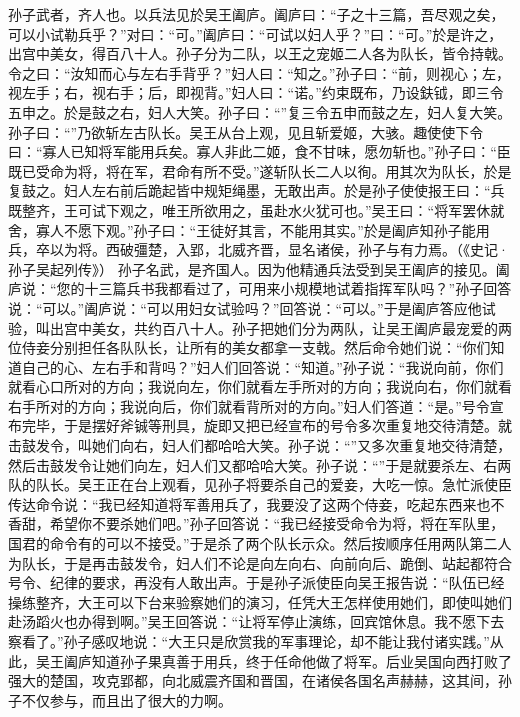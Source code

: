 \documentclass[11pt,a4paper,twoside]{book}
\begin{document}
\begin{paracol}{2}
孙子武者，齐人也。以兵法见於吴王阖庐。阖庐曰：“子之十三篇，吾尽观之矣，可以小试勒兵乎？”对曰：“可。”阖庐曰：“可试以妇人乎？”曰：“可。”於是许之，出宫中美女，得百八十人。孙子分为二队，以王之宠姬二人各为队长，皆令持戟。令之曰：“汝知而心与左右手背乎？”妇人曰：“知之。”孙子曰：“前，则视心；左，视左手；右，视右手；后，即视背。”妇人曰：“诺。”约束既布，乃设鈇钺，即三令五申之。於是鼓之右，妇人大笑。孙子曰：“”复三令五申而鼓之左，妇人复大笑。孙子曰：“”乃欲斩左古队长。吴王从台上观，见且斩爱姬，大骇。趣使使下令曰：“寡人已知将军能用兵矣。寡人非此二姬，食不甘味，愿勿斩也。”孙子曰：“臣既已受命为将，将在军，君命有所不受。”遂斩队长二人以徇。用其次为队长，於是复鼓之。妇人左右前后跪起皆中规矩绳墨，无敢出声。於是孙子使使报王曰：“兵既整齐，王可试下观之，唯王所欲用之，虽赴水火犹可也。”吴王曰：“将军罢休就舍，寡人不愿下观。”孙子曰：“王徒好其言，不能用其实。”於是阖庐知孙子能用兵，卒以为将。西破彊楚，入郢，北威齐晋，显名诸侯，孙子与有力焉。（《史记·孙子吴起列传》）
\switchcolumn
孙子名武，是齐国人。因为他精通兵法受到吴王阖庐的接见。阖庐说：“您的十三篇兵书我都看过了，可用来小规模地试着指挥军队吗？”孙子回答说：“可以。”阖庐说：“可以用妇女试验吗？”回答说：“可以。”于是阖庐答应他试验，叫出宫中美女，共约百八十人。孙子把她们分为两队，让吴王阖庐最宠爱的两位侍妾分别担任各队队长，让所有的美女都拿一支戟。然后命令她们说：“你们知道自己的心、左右手和背吗？”妇人们回答说：“知道。”孙子说：“我说向前，你们就看心口所对的方向；我说向左，你们就看左手所对的方向；我说向右，你们就看右手所对的方向；我说向后，你们就看背所对的方向。”妇人们答道：“是。”号令宣布完毕，于是摆好斧铖等刑具，旋即又把已经宣布的号令多次重复地交待清楚。就击鼓发令，叫她们向右，妇人们都哈哈大笑。孙子说：“”又多次重复地交待清楚，然后击鼓发令让她们向左，妇人们又都哈哈大笑。孙子说：“”于是就要杀左、右两队的队长。吴王正在台上观看，见孙子将要杀自己的爱妾，大吃一惊。急忙派使臣传达命令说：“我已经知道将军善用兵了，我要没了这两个侍妾，吃起东西来也不香甜，希望你不要杀她们吧。”孙子回答说：“我已经接受命令为将，将在军队里，国君的命令有的可以不接受。”于是杀了两个队长示众。然后按顺序任用两队第二人为队长，于是再击鼓发令，妇人们不论是向左向右、向前向后、跪倒、站起都符合号令、纪律的要求，再没有人敢出声。于是孙子派使臣向吴王报告说：“队伍已经操练整齐，大王可以下台来验察她们的演习，任凭大王怎样使用她们，即使叫她们赴汤蹈火也办得到啊。”吴王回答说：“让将军停止演练，回宾馆休息。我不愿下去察看了。”孙子感叹地说：“大王只是欣赏我的军事理论，却不能让我付诸实践。”从此，吴王阖庐知道孙子果真善于用兵，终于任命他做了将军。后业吴国向西打败了强大的楚国，攻克郢都，向北威震齐国和晋国，在诸侯各国名声赫赫，这其间，孙子不仅参与，而且出了很大的力啊。
\end{paracol}
\end{document}
